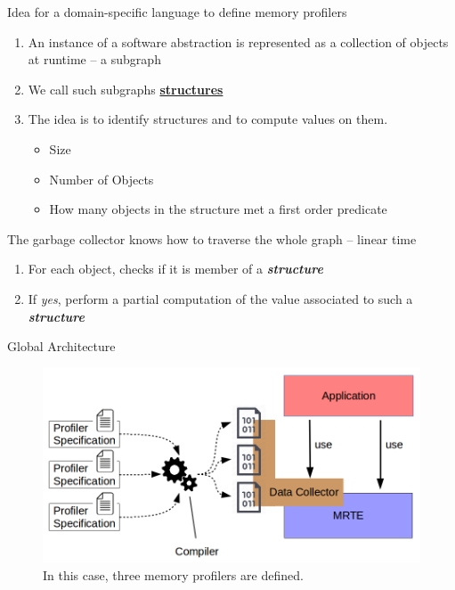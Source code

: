 \documentclass[10pt,xcolor={dvipsnames}]{beamer}
\begin{document}
	\begin{frame}{Idea for a domain-specific language to define memory profilers}
		\begin{enumerate}
			\item An instance of a software abstraction is represented as a collection of objects at runtime -- a subgraph
			\item We call such subgraphs \underline{\textbf{structures}}
			\item The idea is to identify structures and to compute values on them.
			\begin{itemize}
				\item Size
				\item Number of Objects
				\item How many objects in the structure met a first order predicate
			\end{itemize}
		\end{enumerate}
		\vfill
		\begin{alertblock}{The garbage collector knows how to traverse the whole graph -- linear time}
			\begin{enumerate}[S1]
				\item For each object, checks if it is member of a \textit{\textbf{structure}}
				\item If \textit{yes}, perform a partial computation of the value associated to such a \textit{\textbf{structure}}
			\end{enumerate}
		\end{alertblock}
		
	\end{frame}
	
	\begin{frame}{Global Architecture}
		\begin{figure}[!ht]
			\centering
			\includegraphics[scale=0.3]{../chapter6/fig/global-view.png}
			\caption{\scriptsize In this case, three memory profilers are defined.}
		\end{figure}
	\end{frame}
	
\end{document}
